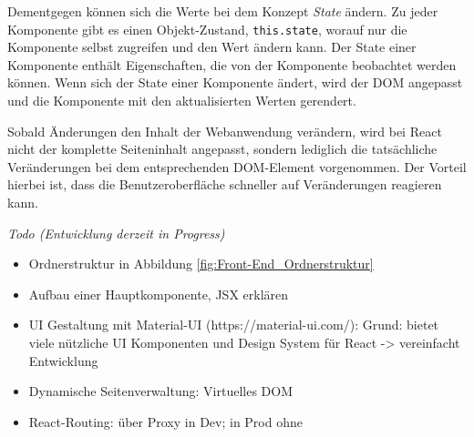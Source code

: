 Dementgegen können sich die Werte bei dem Konzept \textit{State} ändern. 
Zu jeder Komponente gibt es einen Objekt-Zustand, \texttt{this.state}, worauf nur die Komponente selbst zugreifen und den Wert ändern kann. 
Der State einer Komponente enthält Eigenschaften, die von der Komponente beobachtet werden können. 
Wenn sich der State einer Komponente ändert, wird der \ac{DOM} angepasst und die Komponente mit den aktualisierten Werten gerendert. 

Sobald Änderungen den Inhalt der Webanwendung verändern, wird bei React nicht der komplette Seiteninhalt angepasst, sondern lediglich die tatsächliche Veränderungen bei dem entsprechenden \ac{DOM}-Element vorgenommen. 
Der Vorteil hierbei ist, dass die Benutzeroberfläche schneller auf Veränderungen reagieren kann. 

\textit{Todo (Entwicklung derzeit in Progress)}
\begin{itemize}
	\item Ordnerstruktur in Abbildung \vref{fig:Front-End_Ordnerstruktur}
	\item Aufbau einer Hauptkomponente, JSX erklären
	\item UI Gestaltung mit Material-UI (https://material-ui.com/):
		\subitem Grund: bietet viele nützliche UI Komponenten und Design System für React -> vereinfacht Entwicklung
	\item Dynamische Seitenverwaltung: Virtuelles \ac{DOM}
	\item React-Routing: über Proxy in Dev; in Prod ohne
\end{itemize}

